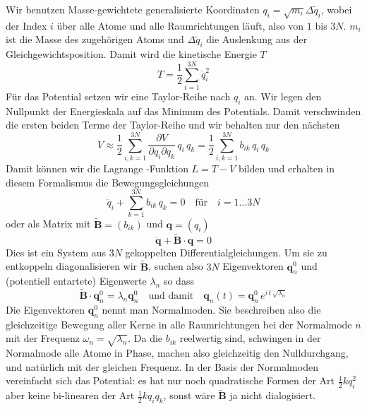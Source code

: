 Wir benutzen Masse-gewichtete generalisierte Koordinaten $q_i = \sqrt{m_i}  \Delta \tilde{q}_i$, wobei der Index $i$ über alle Atome und alle Raumrichtungen läuft, also von $1$ bis $3N$. $m_i$ ist die Masse des zugehörigen Atoms und 
$\Delta \tilde{q}_i$ die Auslenkung aus der Gleichgewichtsposition. Damit wird  die kinetische Energie $T$ 
\begin{equation}
T = \frac{1}{2} \sum_{i=1}^{3N} \dot{q}_i^2
\end{equation}
Für das Potential setzen wir eine Taylor-Reihe nach $q_i$ an. Wir legen den Nullpunkt der Energieskala auf das Minimum des Potentials. Damit verschwinden die ersten beiden Terme der Taylor-Reihe und wir behalten nur den nächsten
\begin{equation}
V \approx \frac{1}{2} \sum_{i,k = 1}^{3N} \frac{\partial V}{\partial q_i \partial q_k} \, q_i \, q_k = 
 \frac{1}{2} \sum_{i,k = 1}^{3N} b_{ik} \, q_i \, q_k 
\end{equation}
Damit können wir die Lagrange -Funktion $L = T - V$ bilden und erhalten in diesem Formalismus die Bewegungsgleichungen
\begin{equation}
 \ddot{q}_i + \sum_{k = 1}^{3N} b_{ik} \, q_k = 0 \quad \text{für} \quad i = 1 \dots 3N
\end{equation}
oder als Matrix mit $\tilde{\mathbf{B}} = (b_{ik})$ und $\mathbf{q} = (q_i)$
\begin{equation}
\ddot{\mathbf{q}} + \tilde{\mathbf{B}}  \cdot  \mathbf{q} = 0
\end{equation}
Dies ist ein System aus $3N$ gekoppelten Differentialgleichungen. Um sie zu entkoppeln diagonalisieren wir 
$\tilde{\mathbf{B}} $, suchen also $3N$ Eigenvektoren   $\mathbf{q}_n^0$ und (potentiell entartete) Eigenwerte $\lambda_n$ so dass
\begin{equation}
 \tilde{\mathbf{B}} \cdot \mathbf{q}_n^0 = \lambda_n \mathbf{q}_n^0 \quad \text{und damit} \quad
 \mathbf{q}_n(t) =  \mathbf{q}_n^0 \, e^{i \, t \, \sqrt{\lambda_n}}
\end{equation}
Die Eigenvektoren   $\mathbf{q}_n^0$ nennt man Normalmoden. Sie beschreiben also die gleichzeitige Bewegung aller Kerne in alle Raumrichtungen bei der Normalmode $n$ mit der Frequenz $\omega_n = \sqrt{\lambda_n}$. Da die $b_{ik}$ reelwertig sind, schwingen in der Normalmode alle Atome in Phase, machen also gleichzeitig den Nulldurchgang, und natürlich mit der gleichen Frequenz. In der Basis der Normalmoden vereinfacht sich das Potential: es hat nur noch quadratische Formen der Art $\frac{1}{2} k q_i^2$ aber keine bi-linearen der Art $\frac{1}{2} k q_i q_k$, sonst wäre $\tilde{\mathbf{B}} $ ja nicht dialogisiert.

